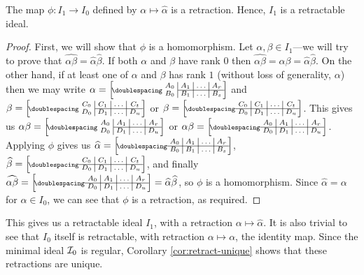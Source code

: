 \begin{proposition}
  \label{prop:hat-retraction}
  The map $\phi: I_1 \to I_0$ defined by $\alpha \mapsto \widehat\alpha$ is a
  retraction.  Hence, $I_1$ is a retractable ideal.
  \begin{proof}
    First, we will show that $\phi$ is a homomorphism.  Let
    $\alpha,\beta \in I_1$---we will try to prove that
    $\widehat{\alpha\beta} = \widehat\alpha \widehat\beta$.  If both $\alpha$
    and $\beta$ have rank $0$ then
    $\widehat{\alpha\beta} = \alpha\beta = \widehat\alpha \widehat\beta$.  On
    the other hand, if at least one of $\alpha$ and $\beta$ has rank $1$ (without
    loss of generality, $\alpha$) then we may write
    $\alpha = \bipart{c|c|c|c}{2-4}{A_0&A_1&\ldots&A_r}{B_0&B_1&\ldots&B_s}$ and
    $\beta = \bipart{c|c|c|c}{2-4}{C_0&C_1&\ldots&C_t}{D_0&D_1&\ldots&D_u}$ or
    $\beta = \bipart{c|c|c|c}{1-4}{C_0&C_1&\ldots&C_t}{D_0&D_1&\ldots&D_u}$.
    This gives us
    $\alpha\beta =
    \bipart{c|c|c|c}{2-4}{A_0&A_1&\ldots&A_r}{D_0&D_1&\ldots&D_u}$ or
    $\alpha\beta =
    \bipart{c|c|c|c}{1-4}{A_0&A_1&\ldots&A_r}{D_0&D_1&\ldots&D_u}$.  Applying
    $\phi$ gives us
    $\widehat\alpha =
    \bipart{c|c|c|c}{1-4}{A_0&A_1&\ldots&A_r}{B_0&B_1&\ldots&B_s}$,
    $\widehat\beta =
    \bipart{c|c|c|c}{1-4}{C_0&C_1&\ldots&C_t}{D_0&D_1&\ldots&D_u}$, and finally
    $\widehat{\alpha\beta} =
    \bipart{c|c|c|c}{1-4}{A_0&A_1&\ldots&A_r}{D_0&D_1&\ldots&D_u} =
    \widehat\alpha \widehat\beta$, so $\phi$ is a homomorphism.  Since
    $\widehat\alpha = \alpha$ for $\alpha \in I_0$, we can see that $\phi$ is a
    retraction, as required.
  \end{proof}
\end{proposition}

This gives us a retractable ideal $I_1$, with a retraction
$\alpha \mapsto \widehat\alpha$.  It is also trivial to see that $I_0$ itself is
retractable, with retraction $\alpha \mapsto \alpha$, the identity map.  Since
the minimal ideal $\mathcal{I}_0$ is regular, Corollary \ref{cor:retract-unique} shows
that these retractions are unique.

